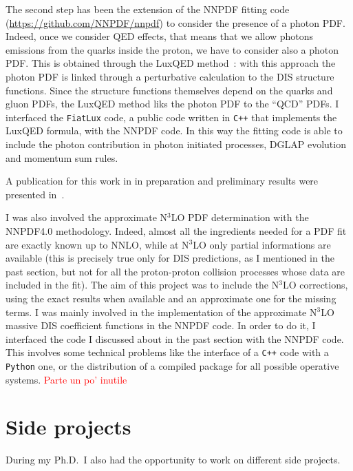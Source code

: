 \documentclass[11pt,a4paper]{moderncv}        %
\begin{document}
The second step has been the extension of the NNPDF fitting code (\url{https://github.com/NNPDF/nnpdf}) to consider the presence of
a photon PDF.
Indeed, once we consider QED effects, that means that we allow photons emissions from the quarks inside the proton, we have to consider also
a photon PDF.
This is obtained through the LuxQED method~\cite{Manohar:2016nzj, Manohar:2017eqh}: with this approach the photon PDF is linked through
a perturbative calculation to the DIS structure functions.
Since the structure functions themselves depend on the quarks and gluon PDFs, the LuxQED method liks the photon PDF to the ``QCD'' PDFs.
I interfaced the \texttt{FiatLux} code, a public code written in \texttt{C++} that implements the LuxQED formula, with the NNPDF code.
In this way the fitting code is able to include the photon contribution in photon initiated processes, DGLAP evolution and momentum sum rules.

A publication for this work in in preparation and preliminary results were presented in~\cite{LAURENTI2023}.

I was also involved the approximate N$^3$LO PDF determination with the NNPDF4.0 methodology.
Indeed, almost all the ingredients needed for a PDF fit are exactly known up to NNLO, while at N$^3$LO only partial informations
are available (this is precisely true only for DIS predictions, as I mentioned in the past section, but not for all the proton-proton
collision processes whose data are included in the fit).
The aim of this project was to include the N$^3$LO corrections, using the exact results when available and an approximate one
for the missing terms.
I was mainly involved in the implementation of the approximate N$^3$LO massive DIS coefficient functions in the NNPDF code.
In order to do it, I interfaced the code I discussed about in the past section with the NNPDF code.
This involves some technical problems like the interface of a \texttt{C++} code with a \texttt{Python} one, or the distribution of
a compiled package for all possible operative systems. \textcolor{red}{Parte un po' inutile}


\section{Side projects}

During my Ph.D.\ I also had the opportunity to work on different side projects.
\end{document}
